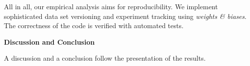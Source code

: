 All in all, our empirical analysis aims for reproducibility. We implement sophisticated data set versioning and experiment tracking using \textit{weights \& biases}. The correctness of the code is verified with automated tests. 

\textbf{Discussion and Conclusion}

A discussion and a conclusion follow the presentation of the results.


